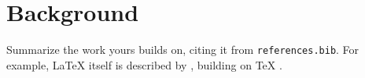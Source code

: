 \chapter{Background}
\label{chap:background}

Summarize the work yours builds on, citing it from \texttt{references.bib}. For example,
\LaTeX{} itself is described by \citet{lamport1994latex}, building on \TeX{}
\citep{knuth1984texbook}.
